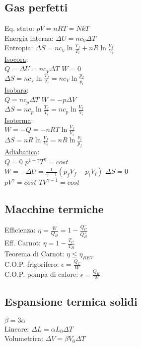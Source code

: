 \documentclass[8pt]{scrreprt}
\begin{document}
\begin{multicols*}{3}
\subsection*{Gas perfetti}
Eq. stato: $pV = nRT = NkT$\\
Energia interna: $\Delta U = n c_V \Delta T$\\
Entropia: $\Delta S = n c_V \ln \frac{T_f}{T_i} + nR \ln \frac{V_f}{V_i}$\\
\underline{Isocora}:\\ $Q = \Delta U = n c_V \Delta T$ \quad $W = 0$\\
$\Delta S = n c_V \ln \frac{T_f}{T_i} = n c_V \ln \frac{p_f}{p_i}$\\
\underline{Isobara}:\\ $Q = n c_p \Delta T$ \quad $W = -p \Delta V$\\
$\Delta S = n c_p \ln \frac{T_f}{T_i} = nc_p \ln \frac{V_f}{V_i}$\\
\underline{Isoterma}:\\ $W = -Q = -nRT \ln \frac{V_f}{V_i}$\\
$\Delta S = nR \ln \frac{V_f}{V_i} = nR \ln \frac{p_i}{p_f}$\\
\underline{Adiabatica}:\\ $Q = 0$ \quad $p^{1-\gamma} T^\gamma = cost$\\
$W = -\Delta U = \frac{1}{\gamma - 1}(p_f V_f - p_i V_i)$ \quad $\Delta S = 0$\\
$pV^\gamma = cost$ \quad $TV^{\gamma - 1} = cost$

\vspace{-3mm}
\subsection*{Macchine termiche}
Efficienza: $\eta = \frac{W}{Q_H} = 1 - \frac{Q_C^-}{Q_H^+}$\\
Eff. Carnot: $\eta = 1 - \frac{T_C}{T_H}$\\
Teorema di Carnot: $\eta \leq \eta_{REV}$\\
C.O.P. frigorifero: $\epsilon = \frac{Q_C}{W}$\\
C.O.P. pompa di calore: $\epsilon = \frac{Q_H}{W}$

\vspace{-3mm}
\subsection*{Espansione termica solidi}
$\beta = 3\alpha$\\
Lineare: $\Delta L= \alpha L_0 \Delta T$\\
Volumetrica: $\Delta V = \beta V_0 \Delta T$


\end{multicols*}
\end{document}
